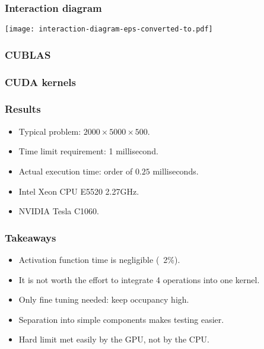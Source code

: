 \begin{frame}
    \frametitle{Interaction diagram}
\texttt{[image: interaction-diagram-eps-converted-to.pdf]}
\end{frame}



\begin{frame}
      \frametitle{CUBLAS}
      
\end{frame}

\begin{frame}
      \frametitle{CUDA kernels}
      
\end{frame}

\begin{frame}
      \frametitle{Results}
\begin{itemize}
\item Typical problem: \(2000\times5000\times 500\).
\item Time limit requirement: 1 millisecond.
\item Actual execution time: order of \(0.25\) milliseconds.
\item Intel Xeon CPU E5520 2.27GHz.
\item NVIDIA Tesla C1060.
\end{itemize}
\end{frame}

\begin{frame}
      \frametitle{Takeaways}
\begin{itemize}
\item Activation function time is negligible (~2\%).
\item It is not worth the effort to integrate 4 operations into one kernel.
\item Only fine tuning needed: keep occupancy high.
\item Separation into simple components makes testing easier.
\item Hard limit met easily by the GPU, not by the CPU.
\end{itemize}
\end{frame}



